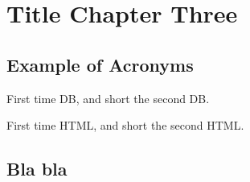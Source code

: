 \chapter{Title Chapter Three}

\section{Example of Acronyms}

First time \gls{DB}, and short the second \gls{DB}.
\par
First time \gls{HTML}, and short the second \gls{HTML}.

\section{Bla bla}
\lipsum[1-3]